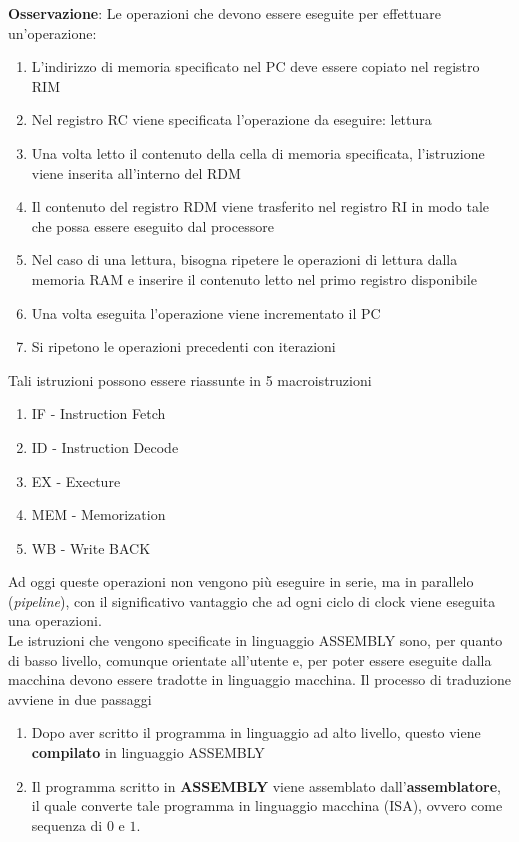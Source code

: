 \documentclass[a4paper]{extarticle}
\begin{document}
\vspace{1em}
\noindent
\textbf{Osservazione}: Le operazioni che devono essere eseguite per effettuare un'operazione:
\begin{enumerate}
    \item L'indirizzo di memoria specificato nel PC deve essere copiato nel registro RIM
    \item Nel registro RC viene specificata l'operazione da eseguire: lettura
    \item Una volta letto il contenuto della cella di memoria specificata, l'istruzione viene inserita all'interno del RDM
    \item Il contenuto del registro RDM viene trasferito nel registro RI in modo tale che possa essere eseguito dal processore
    \item Nel caso di una lettura, bisogna ripetere le operazioni di lettura dalla memoria RAM e inserire il contenuto letto nel primo registro disponibile
    \item Una volta eseguita l'operazione viene incrementato il PC
    \item Si ripetono le operazioni precedenti con iterazioni
\end{enumerate}
Tali istruzioni possono essere riassunte in 5 macroistruzioni
\begin{enumerate}
    \item IF - Instruction Fetch
    \item ID - Instruction Decode
    \item EX - Execture
    \item MEM - Memorization
    \item WB - Write BACK
\end{enumerate}
Ad oggi queste operazioni non vengono più eseguire in serie, ma in parallelo (\textit{pipeline}), con il significativo vantaggio che ad ogni ciclo di clock viene eseguita una operazioni.\\
Le istruzioni che vengono specificate in linguaggio ASSEMBLY sono, per quanto di basso livello, comunque orientate all'utente e, per poter essere eseguite dalla macchina devono essere tradotte in linguaggio macchina. Il processo di traduzione avviene in due passaggi
\begin{enumerate}
    \item Dopo aver scritto il programma in linguaggio ad alto livello, questo viene \textbf{compilato} in linguaggio ASSEMBLY
    \item Il programma scritto in \textbf{ASSEMBLY} viene assemblato dall'\textbf{assemblatore}, il quale converte tale programma in linguaggio macchina (ISA), ovvero come sequenza di \(0\) e \(1\).
\end{enumerate}
\end{document}
